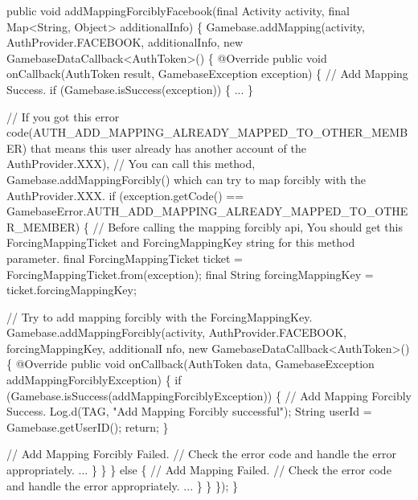 \begin{DoxyCode}
 \textcolor{keyword}{public} \textcolor{keywordtype}{void} addMappingForciblyFacebook(\textcolor{keyword}{final} Activity activity, \textcolor{keyword}{final} Map<String, Object> additionalInfo) 
      \{
    Gamebase.addMapping(activity, AuthProvider.FACEBOOK, additionalInfo, \textcolor{keyword}{new} 
      GamebaseDataCallback<AuthToken>() \{
        @Override
        public void onCallback(AuthToken result, GamebaseException exception) \{
            \textcolor{comment}{// Add Mapping Success.}
            if (Gamebase.isSuccess(exception)) \{
                ...
            \}

            \textcolor{comment}{// If you got this error code(AUTH\_ADD\_MAPPING\_ALREADY\_MAPPED\_TO\_OTHER\_MEMBER) that means this
       user already has another account of the AuthProvider.XXX),}
            \textcolor{comment}{// You can call this method, Gamebase.addMappingForcibly() which can try to map forcibly with
       the AuthProvider.XXX.}
            if (exception.getCode() == GamebaseError.AUTH\_ADD\_MAPPING\_ALREADY\_MAPPED\_TO\_OTHER\_MEMBER) \{
                \textcolor{comment}{// Before calling the mapping forcibly api, You should get this ForcingMappingTicket and
       ForcingMappingKey string for this method parameter.}
                final ForcingMappingTicket ticket = ForcingMappingTicket.from(exception);
                final String forcingMappingKey = ticket.forcingMappingKey;

                \textcolor{comment}{// Try to add mapping forcibly with the ForcingMappingKey.}
                Gamebase.addMappingForcibly(activity, AuthProvider.FACEBOOK, forcingMappingKey, additionalI
      nfo, new GamebaseDataCallback<AuthToken>() \{
                    @Override
                    public void onCallback(AuthToken data, GamebaseException addMappingForciblyException) \{
                        if (Gamebase.isSuccess(addMappingForciblyException)) \{
                            \textcolor{comment}{// Add Mapping Forcibly Success.}
                            Log.d(TAG, \textcolor{stringliteral}{"Add Mapping Forcibly successful"});
                            String userId = Gamebase.getUserID();
                            return;
                        \}

                        \textcolor{comment}{// Add Mapping Forcibly Failed.}
                        \textcolor{comment}{// Check the error code and handle the error appropriately.}
                        ...
                    \}
                \}
            \} else \{
                \textcolor{comment}{// Add Mapping Failed.}
                \textcolor{comment}{// Check the error code and handle the error appropriately.}
                ...
            \}
        \}
    \});
\}
\end{DoxyCode}


